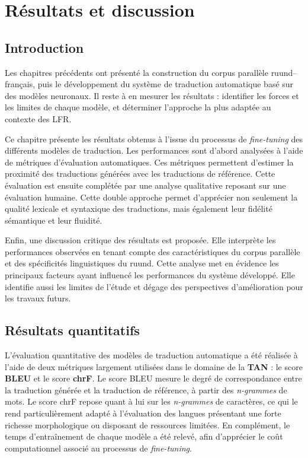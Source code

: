 \chapter{Résultats et discussion}

\section{Introduction}

Les chapitres précédents ont présenté la construction du corpus parallèle ruund--français, puis le développement du système de traduction automatique basé sur des modèles neuronaux. Il reste à en mesurer les résultats : identifier les forces et les limites de chaque modèle, et déterminer l'approche la plus adaptée au contexte des \ac{LFR}.

Ce chapitre présente les résultats obtenus à l'issue du processus de \textit{fine-tuning} des différents modèles de traduction. Les performances sont d'abord analysées à l'aide de métriques d'évaluation automatiques. Ces métriques permettent d'estimer la proximité des traductions générées avec les traductions de référence. Cette évaluation est ensuite complétée par une analyse qualitative reposant sur une évaluation humaine. Cette double approche permet d'apprécier non seulement la qualité lexicale et syntaxique des traductions, mais également leur fidélité sémantique et leur fluidité.

Enfin, une discussion critique des résultats est proposée. Elle interprète les performances observées en tenant compte des caractéristiques du corpus parallèle et des spécificités linguistiques du ruund. Cette analyse met en évidence les principaux facteurs ayant influencé les performances du système développé. Elle identifie aussi les limites de l'étude et dégage des perspectives d'amélioration pour les travaux futurs.

\section{Résultats quantitatifs}
\label{sec:resultats_quantitatifs}

L'évaluation quantitative des modèles de traduction automatique a été réalisée à l'aide de deux métriques largement utilisées dans le domaine de la \textbf{\ac{TAN}} : le score \textbf{\ac{BLEU}} et le score \textbf{\ac{chrF}}. Le score \ac{BLEU} mesure le degré de correspondance entre la traduction générée et la traduction de référence, à partir des \textit{n-grammes} de mots. Le score \ac{chrF} repose quant à lui sur les \textit{n-grammes} de caractères, ce qui le rend particulièrement adapté à l'évaluation des langues présentant une forte richesse morphologique ou disposant de ressources limitées. En complément, le temps d'entraînement de chaque modèle a été relevé, afin d'apprécier le coût computationnel associé au processus de \textit{fine-tuning}.

